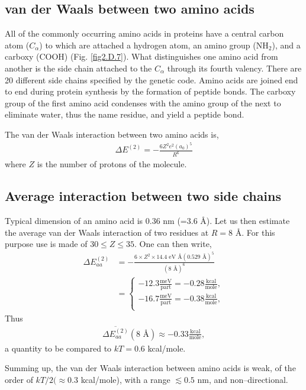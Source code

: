 \begin{subappendices}
 \subsection{van der Waals between two amino acids}
 All of the commonly occurring amino acids in proteins have a central carbon atom ($C_\alpha$) to which are attached a hydrogen atom, an amino group (NH$_2$), and a carboxy (COOH) (Fig. \ref{fig2.D.7}). What distinguishes one amino acid from another is the side chain attached to the $C_\alpha$ through its fourth valency. There are 20 different side chains specified by the genetic code.
 Amino acids are joined end to end during protein synthesis by the formation of peptide bonds. The carboxy group of the first amino acid condenses with the amino group of the next to eliminate water, thus the name residue, and yield a peptide bond.
 
 
 The van der Waals interaction between two amino acids is,
   \begin{align}\label{eq2.D.26}
\Delta E^{(2)}=-\frac{6Z^2e^2(a_0)^5}{R^6}
   \end{align} 
 where $Z$ is the number of protons of the molecule.
 \subsection{Average interaction between two side chains}
 Typical dimension of an amino acid is 0.36 nm (=3.6 \AA). Let us then estimate the average van der Waals interaction of two residues at $R=8$ \AA. For this purpose use is made of $30\leq Z\leq 35$. One can then write,
   \begin{align}\label{eq2.D.27}
\nonumber \Delta E_{aa}^{(2)}&=-\frac{6\times Z^2\times 14.4\text{ eV \AA} (0.529\text{ \AA})^5}{(8\text{ \AA})^6}\\
&=\left\{\begin{array}{c}
 -12.3\frac{\text{meV}}{\text{part}}=-0.28\frac{\text{kcal}}{\text{mole}},\\
  -16.7\frac{\text{meV}}{\text{part}}=-0.38\frac{\text{kcal}}{\text{mole}},\\
\end{array}\right. 
   \end{align} 
 Thus
    \begin{align}\label{eq2.D.28}
\overline{\Delta E_{aa}^{(2)}}(8\text{ \AA})\approx-0.33\frac{\text{kcal}}{\text{mole}},
    \end{align} 
 a quantity to be compared to $kT=0.6$ kcal/mole.
 
 Summing up, the van der Waals interaction between amino acids is weak, of the order of $kT/2(\approx0.3 $ kcal/mole), with a range $\lesssim0.5$ nm, and non--directional.

\end{subappendices}

